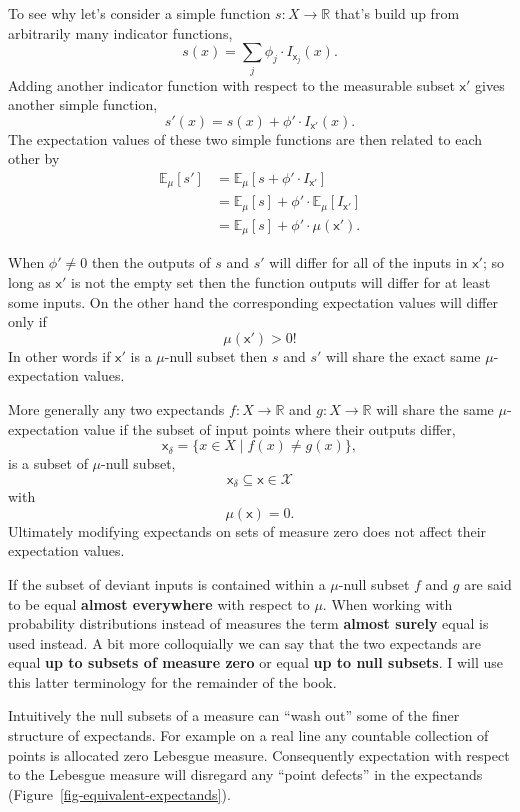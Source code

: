 \documentclass[
  letterpaper,
  DIV=11,
  numbers=noendperiod]{scrartcl}
\begin{document}
To see why let's consider a simple function
\(s: X \rightarrow \mathbb{R}\) that's build up from arbitrarily many
indicator functions, \[
s(x) = \sum_{j} \phi_{j} \cdot I_{\mathsf{x}_{j}}(x).
\] Adding another indicator function with respect to the measurable
subset \(\mathsf{x}'\) gives another simple function, \[
s'(x) = s(x) + \phi' \cdot I_{\mathsf{x}'}(x).
\] The expectation values of these two simple functions are then related
to each other by \begin{align*}
\mathbb{E}_{\mu}[s']
&=
\mathbb{E}_{\mu}[s + \phi' \cdot I_{\mathsf{x}'}]
\\
&=
\mathbb{E}_{\mu}[s] + \phi' \cdot \mathbb{E}_{\mu}[I_{\mathsf{x}'}]
\\
&=
\mathbb{E}_{\mu}[s] + \phi' \cdot \mu(\mathsf{x}').
\end{align*}

When \(\phi' \ne 0\) then the outputs of \(s\) and \(s'\) will differ
for all of the inputs in \(\mathsf{x}'\); so long as \(\mathsf{x}'\) is
not the empty set then the function outputs will differ for at least
some inputs. On the other hand the corresponding expectation values will
differ only if \[
\mu(\mathsf{x}') > 0!
\] In other words if \(\mathsf{x}'\) is a \(\mu\)-null subset then \(s\)
and \(s'\) will share the exact same \(\mu\)-expectation values.

More generally any two expectands \(f: X \rightarrow \mathbb{R}\) and
\(g: X \rightarrow \mathbb{R}\) will share the same \(\mu\)-expectation
value if the subset of input points where their outputs differ, \[
\mathsf{x}_{\delta} = \{ x \in X \mid f(x) \ne g(x) \},
\] is a subset of \(\mu\)-null subset, \[
\mathsf{x}_{\delta} \subseteq \mathsf{x} \in \mathcal{X}
\] with \[
\mu(\mathsf{x}) = 0.
\] Ultimately modifying expectands on sets of measure zero does not
affect their expectation values.

If the subset of deviant inputs is contained within a \(\mu\)-null
subset \(f\) and \(g\) are said to be equal \textbf{almost everywhere}
with respect to \(\mu\). When working with probability distributions
instead of measures the term \textbf{almost surely} equal is used
instead. A bit more colloquially we can say that the two expectands are
equal \textbf{up to subsets of measure zero} or equal \textbf{up to null
subsets}. I will use this latter terminology for the remainder of the
book.

Intuitively the null subsets of a measure can ``wash out'' some of the
finer structure of expectands. For example on a real line any countable
collection of points is allocated zero Lebesgue measure. Consequently
expectation with respect to the Lebesgue measure will disregard any
``point defects'' in the expectands
(Figure~\ref{fig-equivalent-expectands}).
\end{document}
